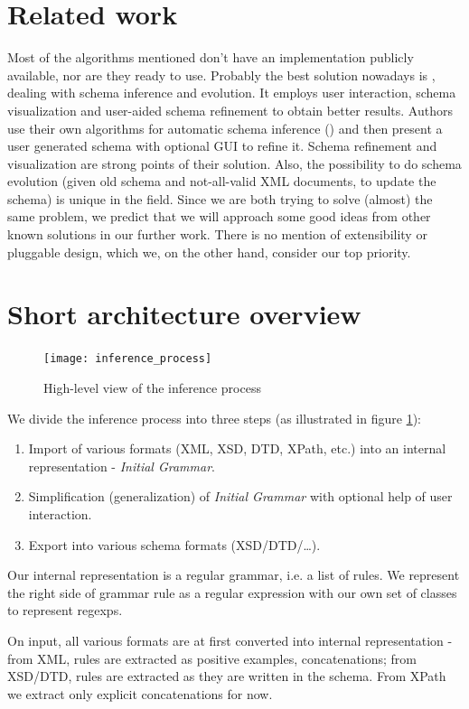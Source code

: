 \documentclass[a4paper,8pt,oneside,twocolumn]{article}
\begin{document}
\section*{Related work}
Most of the algorithms mentioned don't have an implementation publicly available, nor are they ready to use.
Probably the best solution nowadays is \cite{Bex:2008:SSI:1376616.1376750}, dealing with schema inference and evolution.
It employs user interaction, schema visualization and user-aided schema refinement to obtain better results.
Authors use their own algorithms for automatic schema inference (\cite{Bex:2006:ICD:1182635.1164139, Bex:2007:IXS:1325851.1325964}) and then present a user generated schema with optional GUI to refine it.
Schema refinement and visualization are strong points of their solution. Also, the possibility to do schema evolution (given old schema and not-all-valid XML documents, to update the schema) is unique in the field.
Since we are both trying to solve (almost) the same problem, we predict that we will approach some good ideas from other known solutions in our further work.
There is no mention of extensibility or pluggable design, which we, on the other hand, consider our top priority.

\section*{Short architecture overview}
\begin{figure}
	\centering\texttt{[image: inference\_process]}
	\caption{High-level view of the inference process} \label{inference_process}
\end{figure}
We divide the inference process into three steps (as illustrated in figure \ref{inference_process}):
\begin{enumerate}
	\item Import of various formats (XML, XSD, DTD, XPath, etc.) into an internal representation - \emph{Initial Grammar}.
	\item Simplification (generalization) of \emph{Initial Grammar} with optional help of user interaction.
	\item Export into various schema formats (XSD/DTD/\ldots).
\end{enumerate}	
Our internal representation is a regular grammar, i.e. a list of rules.
We represent the right side of grammar rule as a regular expression with our own set of classes to represent regexps.

On input, all various formats are at first converted into internal representation - from XML, rules are extracted as positive examples, concatenations; from XSD/DTD, rules are extracted as they are written in the schema. From XPath we extract only explicit concatenations for now.
\end{document}
